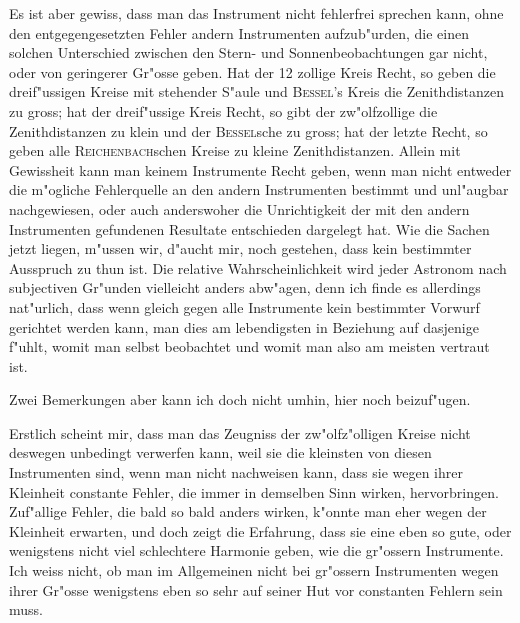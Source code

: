 \documentclass[12pt,a4paper]{article}
\begin{document}
Es ist aber gewiss, dass man das Instrument nicht fehlerfrei sprechen kann, ohne den entgegengesetzten
Fehler andern Instrumenten aufzub"urden, die einen solchen Unterschied zwischen den Stern- und
Sonnenbeobachtungen gar nicht, oder von geringerer Gr"osse geben. Hat der 12 zollige Kreis Recht,
so geben die dreif"ussigen Kreise mit stehender S"aule und \textsc{Bessel}'s Kreis die Zenithdistanzen zu gross;
hat der dreif"ussige Kreis Recht, so gibt der zw"olfzollige die Zenithdistanzen zu klein und der \textsc{Bessel}sche
zu gross; hat der letzte Recht, so geben alle \textsc{Reichenbach}schen Kreise zu kleine Zenithdistanzen.
Allein mit Gewissheit kann man keinem Instrumente Recht geben, wenn man nicht entweder die m"ogliche
Fehlerquelle an den andern Instrumenten bestimmt und unl"augbar nachgewiesen, oder auch anderswoher
die Unrichtigkeit der mit den andern Instrumenten gefundenen Resultate entschieden dargelegt hat.
Wie die Sachen jetzt liegen, m"ussen wir, d"aucht mir, noch gestehen, dass kein bestimmter Ausspruch
zu thun ist. Die relative Wahrscheinlichkeit wird jeder Astronom nach subjectiven Gr"unden vielleicht
anders abw"agen, denn ich finde es allerdings nat"urlich, dass wenn gleich gegen alle Instrumente kein
bestimmter Vorwurf gerichtet werden kann, man dies am lebendigsten in Beziehung auf dasjenige f"uhlt,
womit man selbst beobachtet und womit man also am meisten vertraut ist.

Zwei Bemerkungen aber kann ich doch nicht umhin, hier noch beizuf"ugen.

Erstlich scheint mir, dass man das Zeugniss der zw"olfz"olligen Kreise nicht deswegen unbedingt
verwerfen kann, weil sie die kleinsten von diesen Instrumenten sind, wenn man nicht nachweisen kann,
dass sie wegen ihrer Kleinheit constante Fehler, die immer in demselben Sinn wirken, hervorbringen.
Zuf"allige Fehler, die bald so bald anders wirken, k"onnte man eher wegen der Kleinheit erwarten, und
doch zeigt die Erfahrung, dass sie eine eben so gute, oder wenigstens nicht viel schlechtere Harmonie
geben, wie die gr"ossern Instrumente. Ich weiss nicht, ob man im Allgemeinen nicht bei gr"ossern
Instrumenten wegen ihrer Gr"osse wenigstens eben so sehr auf seiner Hut vor constanten Fehlern sein muss.
\end{document}

